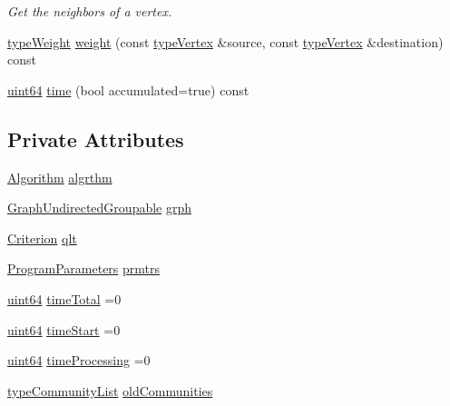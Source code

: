 \begin{DoxyCompactItemize}
\begin{DoxyCompactList}\small\item\em Get the neighbors of a vertex. \end{DoxyCompactList}\item 
\hyperlink{edge_8h_a2e7ea3be891ac8b52f749ec73fee6dd2}{type\+Weight} \hyperlink{classDynCommBase_ae48a572da3c7b375429e96e717b15787}{weight} (const \hyperlink{edge_8h_a5fbd20c46956d479cb10afc9855223f6}{type\+Vertex} \&source, const \hyperlink{edge_8h_a5fbd20c46956d479cb10afc9855223f6}{type\+Vertex} \&destination) const
\item 
\hyperlink{systemDefines_8h_abc0f5bc07737e498f287334775dff2b6}{uint64} \hyperlink{classDynCommBase_a5b40eb14cef877fde1db8b6476f6a2ce}{time} (bool accumulated=true) const
\end{DoxyCompactItemize}
\subsection*{Private Attributes}
\begin{DoxyCompactItemize}
\item 
\hyperlink{classAlgorithm}{Algorithm} \hyperlink{classDynCommBase_a966f54b7ba340fa782146659998760ed}{algrthm}
\item 
\hyperlink{classGraphUndirectedGroupable}{Graph\+Undirected\+Groupable} \hyperlink{classDynCommBase_ae79d443436131554acb4b3ed24908701}{grph}
\item 
\hyperlink{classCriterion}{Criterion} \hyperlink{classDynCommBase_a6de9b4c868b4b8ca2923db6f6b1f08f7}{qlt}
\item 
\hyperlink{structProgramParameters}{Program\+Parameters} \hyperlink{classDynCommBase_a61a92fd07b37a8153fda9cfebd779dc4}{prmtrs}
\item 
\hyperlink{systemDefines_8h_abc0f5bc07737e498f287334775dff2b6}{uint64} \hyperlink{classDynCommBase_ac796111a001f3c815d4b72e66da47cc2}{time\+Total} =0
\item 
\hyperlink{systemDefines_8h_abc0f5bc07737e498f287334775dff2b6}{uint64} \hyperlink{classDynCommBase_a7795433997aa908ce2b8be2b3f15aba0}{time\+Start} =0
\item 
\hyperlink{systemDefines_8h_abc0f5bc07737e498f287334775dff2b6}{uint64} \hyperlink{classDynCommBase_ae63166e1cbb91574ff23e4c667fad445}{time\+Processing} =0
\item 
\hyperlink{graphUndirectedGroupable_8h_a8d8ff0ef0315e7cd3b62e467487cd0e1}{type\+Community\+List} \hyperlink{classDynCommBase_ac8cd68d0bff480bc59878668369aa2a5}{old\+Communities}
\end{DoxyCompactItemize}
